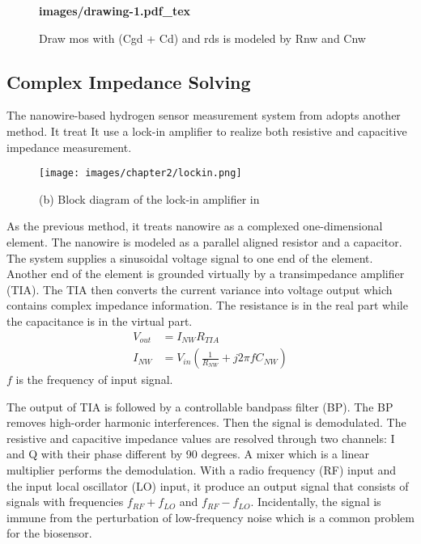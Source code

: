 \begin{figure}[!htbp]
    \centering
    {\selectfont\textbf{
        \def\svgwidth{5.0cm}
        \fontsize{6}{7}\selectfont
         {images/drawing-1.pdf_tex}
    }}
    \fontsize{6}{7}\selectfont
    \caption{Draw mos with (Cgd + Cd) and rds is modeled by Rnw and Cnw}
    \label{fig:tot_mos}
\end{figure}

\subsection{Complex Impedance Solving}
The nanowire-based hydrogen sensor measurement system from \cite{Jlockin} adopts another method.
It treat
It use a lock-in amplifier to realize both resistive and capacitive impedance measurement.

\begin{figure}[!htbp]
        \centering
        \texttt{[image: images/chapter2/lockin.png]}
        \caption{(b) Block diagram of the lock-in amplifier in \cite{Jlockin}}
        \label{fig:lockin}
\end{figure}

As the previous method, it treats nanowire as a complexed one-dimensional element. The nanowire is modeled as a parallel aligned resistor and a capacitor.
The system supplies a sinusoidal voltage signal to one end of the element.
Another end of the element is grounded virtually by a transimpedance amplifier (TIA).
The TIA then converts the current variance into voltage output which contains complex impedance information.
The resistance is in the real part while the capacitance is in the virtual part.
\setlength{\mathindent}{5.5cm}
\begin{align}
    V_{out} &= I_{NW}R_{TIA} \\
    I_{NW} &= V_{in}(\frac{1}{R_{NW}} + j 2\pi fC_{NW})
\end{align}
$f$ is the frequency of input signal.

The output of TIA is followed by a controllable bandpass filter (BP).
The BP removes high-order harmonic interferences.
Then the signal is demodulated.
The resistive and capacitive impedance values are resolved through two channels: I and Q with their phase different by 90 degrees.
A mixer which is a linear multiplier performs the demodulation.
With a radio frequency (RF) input and the input local oscillator (LO) input, it produce an output signal that consists of signals with frequencies $f_{RF} + f_{LO}$ and $f_{RF} - f_{LO}$.
Incidentally, the signal is immune from the perturbation of low-frequency noise which is a common problem for the biosensor.

